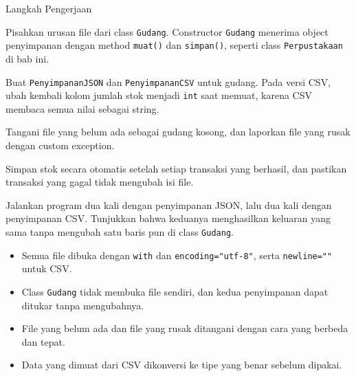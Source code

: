 \begin{langkah}{Langkah Pengerjaan}
  \item Pisahkan urusan file dari class \texttt{Gudang}. Constructor \texttt{Gudang} menerima object penyimpanan dengan method \texttt{muat()} dan \texttt{simpan()}, seperti class \texttt{Perpustakaan} di bab ini.
  \item Buat \texttt{PenyimpananJSON} dan \texttt{PenyimpananCSV} untuk gudang. Pada versi CSV, ubah kembali kolom jumlah stok menjadi \texttt{int} saat memuat, karena CSV membaca semua nilai sebagai string.
  \item Tangani file yang belum ada sebagai gudang kosong, dan laporkan file yang rusak dengan custom exception.
  \item Simpan stok secara otomatis setelah setiap transaksi yang berhasil, dan pastikan transaksi yang gagal tidak mengubah isi file.
  \item Jalankan program dua kali dengan penyimpanan JSON, lalu dua kali dengan penyimpanan CSV. Tunjukkan bahwa keduanya menghasilkan keluaran yang sama tanpa mengubah satu baris pun di class \texttt{Gudang}.
\end{langkah}

\begin{penting}
\begin{itemize}
  \item Semua file dibuka dengan \texttt{with} dan \texttt{encoding="utf-8"}, serta \texttt{newline=""} untuk CSV.
  \item Class \texttt{Gudang} tidak membuka file sendiri, dan kedua penyimpanan dapat ditukar tanpa mengubahnya.
  \item File yang belum ada dan file yang rusak ditangani dengan cara yang berbeda dan tepat.
  \item Data yang dimuat dari CSV dikonversi ke tipe yang benar sebelum dipakai.
\end{itemize}
\end{penting}